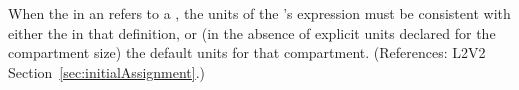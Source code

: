 When the  in an \InitialAssignment refers to a
\Compartment, the units of the \InitialAssignment's  expression
must be consistent with either the  in that \Compartment
definition, or (in the absence of explicit units declared for the
compartment size) the default units for that compartment.  (References:
L2V2 Section~\ref{sec:initialAssignment}.)
